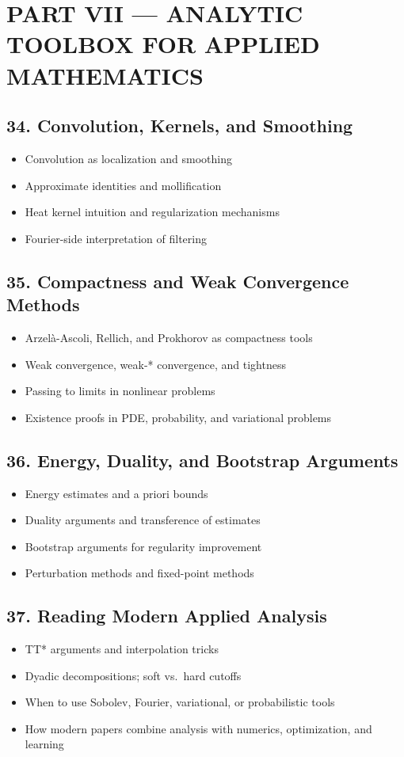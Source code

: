 \section{PART VII --- ANALYTIC TOOLBOX FOR APPLIED MATHEMATICS}

\subsection{34. Convolution, Kernels, and Smoothing}
\begin{itemize}
\item Convolution as localization and smoothing
\item Approximate identities and mollification
\item Heat kernel intuition and regularization mechanisms
\item Fourier-side interpretation of filtering
\end{itemize}

\subsection{35. Compactness and Weak Convergence Methods}
\begin{itemize}
\item Arzel\`a-Ascoli, Rellich, and Prokhorov as compactness tools
\item Weak convergence, weak-* convergence, and tightness
\item Passing to limits in nonlinear problems
\item Existence proofs in PDE, probability, and variational problems
\end{itemize}

\subsection{36. Energy, Duality, and Bootstrap Arguments}
\begin{itemize}
\item Energy estimates and a priori bounds
\item Duality arguments and transference of estimates
\item Bootstrap arguments for regularity improvement
\item Perturbation methods and fixed-point methods
\end{itemize}

\subsection{37. Reading Modern Applied Analysis}
\begin{itemize}
\item TT* arguments and interpolation tricks
\item Dyadic decompositions; soft vs.\ hard cutoffs
\item When to use Sobolev, Fourier, variational, or probabilistic tools
\item How modern papers combine analysis with numerics, optimization, and learning
\end{itemize}
